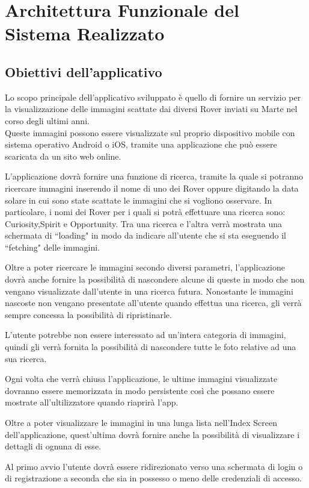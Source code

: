 \chapter{Architettura Funzionale del Sistema Realizzato}
\section{Obiettivi dell'applicativo}
Lo scopo principale dell'applicativo sviluppato \`e quello di fornire un servizio per la visualizzazione delle immagini scattate dai diversi Rover inviati su Marte nel corso degli ultimi anni.\\
Queste immagini possono essere visualizzate sul proprio dispositivo mobile con sistema operativo Android o iOS, tramite una applicazione che pu\`o essere scaricata da un sito web online.

L'applicazione dovr\`a fornire una funzione di ricerca, tramite la quale si potranno ricercare immagini inserendo il nome di uno dei Rover oppure digitando la data solare in cui sono state scattate le immagini che si vogliono osservare. In particolare, i nomi dei Rover per i quali si potr\`a effettuare una ricerca sono: Curiosity,Spirit e Opportunity.
Tra una ricerca e l'altra verr\`a mostrata una schermata di ``loading" in modo da indicare all'utente che si sta eseguendo il ``fetching" delle immagini.

Oltre a poter ricercare le immagini secondo diversi parametri, l'applicazione dovr\`a anche fornire la possibilit\`a di nascondere alcune di queste in modo che non vengano visualizzate dall'utente in una ricerca futura.
Nonostante le immagini nascoste non vengano presentate all'utente quando effettua una ricerca, gli verr\`a sempre concessa la possibilit\`a di ripristinarle.

L'utente potrebbe non essere interessato ad un'intera categoria di immagini, quindi gli verr\`a fornita la possibilit\`a di nascondere tutte le foto relative ad una sua ricerca.

Ogni volta che verr\`a chiusa l'applicazione, le ultime immagini visualizzate dovranno essere memorizzata in modo persistente cos\`i che possano essere mostrate all'ultilizzatore quando riaprir\`a l'app.

Oltre a poter visualizzare le immagini in una lunga lista nell'Index Screen dell'applicazione, quest'ultima dovr\`a fornire anche la possibilit\`a di visualizzare i dettagli di ognuna di esse.

Al primo avvio l'utente dovr\`a essere ridirezionato verso una schermata di login o di registrazione a seconda che sia in possesso o meno delle credenziali di accesso.

